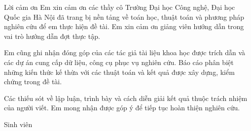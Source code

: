 \begin{preamble}{Lời cảm ơn}
Em xin cảm ơn các thầy cô Trường Đại học Công nghệ, Đại học Quốc gia Hà Nội đã trang bị nền tảng về toán học, thuật toán và phương pháp nghiên cứu để em thực hiện đề tài. Em xin cảm ơn giảng viên hướng dẫn \SupervisorName{} trong vai trò hướng dẫn đợt thực tập.

Em cũng ghi nhận đóng góp của các tác giả tài liệu khoa học được trích dẫn và các dự án cung cấp dữ liệu, công cụ phục vụ nghiên cứu. Báo cáo phân biệt những kiến thức kế thừa với các thuật toán và kết quả được xây dựng, kiểm chứng trong đề tài.

Các thiếu sót về lập luận, trình bày và cách diễn giải kết quả thuộc trách nhiệm của người viết. Em mong nhận được góp ý để tiếp tục hoàn thiện nghiên cứu.

\vspace{1cm}\hfill\begin{minipage}{0.42\linewidth}\centering
  Sinh viên\par\vspace{0.4cm}\textbf{\StudentName}
\end{minipage}
\end{preamble}

